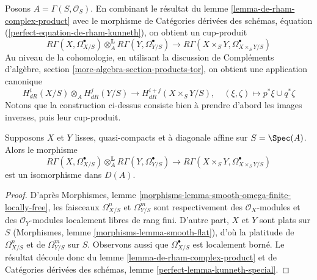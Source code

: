 \noindent
Posons $A = \Gamma(S, \mathcal{O}_S)$. En combinant le résultat du
lemme \ref{lemma-de-rham-complex-product} avec le morphisme de
Catégories dérivées des schémas, équation
(\ref{perfect-equation-de-rham-kunneth}),
on obtient un cup-produit
$$
R\Gamma(X, \Omega^\bullet_{X/S})
\otimes_A^\mathbf{L}
R\Gamma(Y, \Omega^\bullet_{Y/S})
\longrightarrow
R\Gamma(X \times_S Y, \Omega^\bullet_{X \times_S Y/S})
$$
Au niveau de la cohomologie, en utilisant la discussion de
Compléments d'algèbre, section \ref{more-algebra-section-products-tor},
on obtient une application canonique
$$
H^i_{dR}(X/S) \otimes_A H^j_{dR}(Y/S)
\longrightarrow
H^{i + j}_{dR}(X \times_S Y/S),\quad
(\xi, \zeta) \longmapsto p^*\xi \cup q^*\zeta
$$
Notons que la construction ci-dessus consiste bien à
prendre d'abord les images inverses, puis leur cup-produit.

\begin{lemma}
\label{lemma-kunneth-de-rham}
Supposons $X$ et $Y$ lisses, quasi-compacts et à diagonale affine sur
$S = \Spec(A)$. Alors le morphisme
$$
R\Gamma(X, \Omega^\bullet_{X/S})
\otimes_A^\mathbf{L}
R\Gamma(Y, \Omega^\bullet_{Y/S})
\longrightarrow
R\Gamma(X \times_S Y, \Omega^\bullet_{X \times_S Y/S})
$$
est un isomorphisme dans $D(A)$.
\end{lemma}

\begin{proof}
D'après Morphismes, lemme \ref{morphisms-lemma-smooth-omega-finite-locally-free},
les faisceaux $\Omega^n_{X/S}$ et $\Omega^m_{Y/S}$ sont respectivement des
$\mathcal{O}_X$-modules et des $\mathcal{O}_Y$-modules localement libres de rang fini. D'autre part, $X$ et $Y$
sont plats sur $S$ (Morphismes, lemme \ref{morphisms-lemma-smooth-flat}),
d'où la platitude de $\Omega^n_{X/S}$ et de $\Omega^m_{Y/S}$ sur $S$.
Observons aussi que $\Omega^\bullet_{X/S}$ est localement borné. Le résultat
découle donc du lemme \ref{lemma-de-rham-complex-product} et de
Catégories dérivées des schémas, lemme \ref{perfect-lemma-kunneth-special}.
\end{proof}

